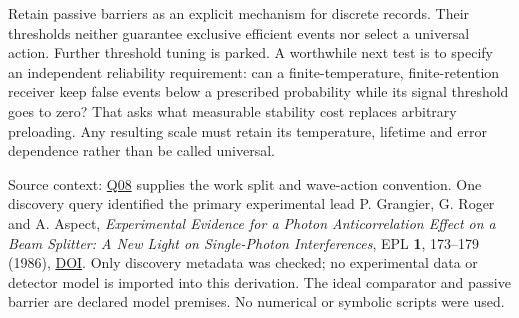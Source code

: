 \documentclass[11pt,a4paper]{article}
\begin{document}
Retain passive barriers as an explicit mechanism for discrete records.
Their thresholds neither guarantee exclusive efficient events nor select
a universal action. Further threshold tuning is parked. A worthwhile
next test is to specify an independent reliability requirement: can a
finite-temperature, finite-retention receiver keep false events below a
prescribed probability while its signal threshold goes to zero? That
asks what measurable stability cost replaces arbitrary preloading. Any
resulting scale must retain its temperature, lifetime and error
dependence rather than be called universal.

Source context: \href{mechanical-interference-action.md}{Q08} supplies
the work split and wave-action convention. One discovery query
identified the primary experimental lead P. Grangier, G. Roger and A.
Aspect, \emph{Experimental Evidence for a Photon Anticorrelation Effect
on a Beam Splitter: A New Light on Single-Photon Interferences}, EPL
\textbf{1}, 173--179 (1986),
\href{https://doi.org/10.1209/0295-5075/1/4/004}{DOI}. Only discovery
metadata was checked; no experimental data or detector model is imported
into this derivation. The ideal comparator and passive barrier are
declared model premises. No numerical or symbolic scripts were used.
\end{document}
